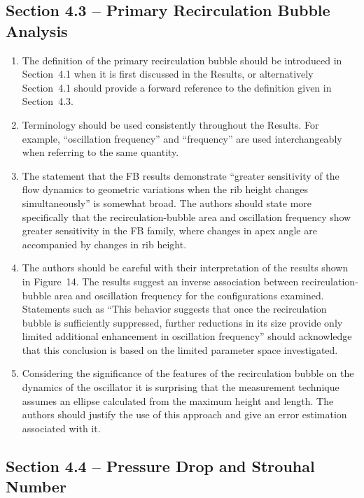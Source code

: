 \documentclass[11pt]{article}
\begin{document}
	\subsection*{Section 4.3 -- Primary Recirculation Bubble Analysis}
	
	\begin{enumerate}
		\item The definition of the primary recirculation bubble should be introduced in Section~4.1 when it is first discussed in the Results, or alternatively Section~4.1 should provide a forward reference to the definition given in Section~4.3.
		\item Terminology should be used consistently throughout the Results. For example, ``oscillation frequency'' and ``frequency'' are used interchangeably when referring to the same quantity. 
		\item The statement that the FB results demonstrate ``greater sensitivity of the flow dynamics to geometric variations when the rib height changes simultaneously'' is somewhat broad. The authors should state more specifically that the recirculation-bubble area and oscillation frequency show greater sensitivity in the FB family, where changes in apex angle are accompanied by changes in rib height.
		
		\item The authors should be careful with their interpretation of the results shown in Figure~14. The results suggest an inverse association between recirculation-bubble area and oscillation frequency for the configurations examined. Statements such as ``This behavior suggests that once the recirculation bubble is sufficiently suppressed, further reductions in its size provide only limited additional enhancement in oscillation frequency'' should acknowledge that this conclusion is based on the limited parameter space investigated.
		
		\item Considering the significance of the features of the recirculation bubble on the dynamics of the oscillator it is surprising that the measurement technique assumes an ellipse calculated from the maximum height and length. The authors should justify the use of this approach and give an error estimation associated with it.
	\end{enumerate}
	
	\subsection*{Section 4.4 -- Pressure Drop and Strouhal Number}
	
\end{document}

